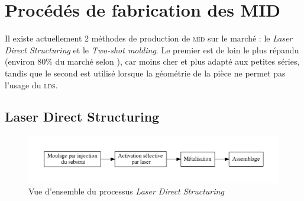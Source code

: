 \section{Procédés de fabrication des MID}
Il existe actuellement 2 méthodes de production de \textsc{mid} sur le marché :
le \emph{Laser Direct Structuring} et le \emph{Two-shot molding}. Le premier est
de loin le plus répandu (environ 80\% du marché selon \cite{mid-2011}), car moins
cher et plus adapté aux petites séries, tandis que le second est utilisé lorsque
la géométrie de la pièce ne permet pas l'usage du \textsc{lds}.

\subsection{Laser Direct Structuring}
\begin{figure}[h]
    \begin{center}
        \includegraphics[width=\textwidth]{images/lds_process}
        \caption{Vue d'ensemble du processus \emph{Laser Direct Structuring}}\label{fig:lds-process}
    \end{center}
\end{figure}
